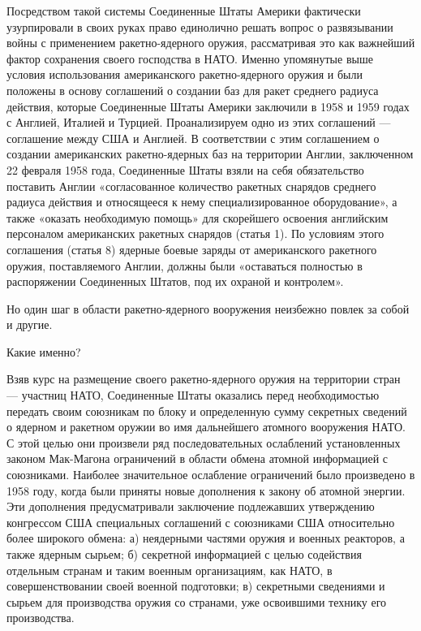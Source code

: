 \documentclass[12pt, a4paper, openany]{book}
\begin{document}
	Посредством такой системы Соединенные Штаты Америки фактически узурпировали в своих руках право единолично решать вопрос о развязывании войны с применением ракетно-ядерного оружия, рассматривая это как важнейший фактор сохранения своего господства в НАТО. Именно упомянутые выше условия использования американского ракетно-ядерного оружия и были положены в основу соглашений о создании баз для ракет среднего радиуса действия, которые Соединенные Штаты Америки заключили в 1958 и 1959 годах с Англией, Италией и Турцией. Проанализируем одно из этих соглашений — соглашение между США и Англией. В соответствии с этим соглашением о создании американских ракетно-ядерных баз на территории Англии, заключенном 22 февраля 1958 года, Соединенные Штаты взяли на себя обязательство поставить Англии «согласованное количество ракетных снарядов среднего радиуса действия и относящееся к нему специализированное оборудование», а также «оказать необходимую помощь» для скорейшего освоения английским персоналом американских ракетных снарядов (статья 1). По условиям этого соглашения (статья 8) ядерные боевые заряды от американского ракетного оружия, поставляемого Англии, должны были «оставаться полностью в распоряжении Соединенных Штатов, под их охраной и контролем».
	
	Но один шаг в области ракетно-ядерного вооружения неизбежно повлек за собой и другие.
	
	Какие именно?
	
	Взяв курс на размещение своего ракетно-ядерного оружия на территории стран — участниц НАТО, Соединенные Штаты оказались перед необходимостью передать своим союзникам по блоку и определенную сумму секретных сведений о ядерном и ракетном оружии во имя дальнейшего атомного вооружения НАТО. С этой целью они произвели ряд последовательных ослаблений установленных законом Мак-Магона ограничений в области обмена атомной информацией с союзниками. Наиболее значительное ослабление ограничений было произведено в 1958 году, когда были приняты новые дополнения к закону об атомной энергии. Эти дополнения предусматривали заключение подлежавших утверждению конгрессом США специальных соглашений с союзниками США относительно более широкого обмена: а) неядерными частями оружия и военных реакторов, а также ядерным сырьем; б) секретной информацией с целью содействия отдельным странам и таким военным организациям, как НАТО, в совершенствовании своей военной подготовки; в) секретными сведениями и сырьем для производства оружия со странами, уже освоившими технику его производства.
	
\end{document}
